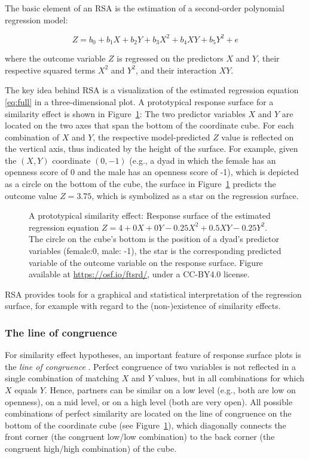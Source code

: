\documentclass[jou,a4paper,draftfirst]{apa6}
\newcommand{\added}[1]{#1}
\begin{document}
The basic element of an RSA is the estimation of a second-order polynomial regression model:

\begin{equation} 
\label{eq:full}
Z = b_0 + b_1 X + b_2 Y + b_3 X^2 + b_4 X Y + b_5 Y^2 + e
\end{equation}

where the outcome variable $Z$ is regressed on the predictors $X$ and $Y$, their respective squared terms $X^2$ and $Y^2$, and their interaction $XY$.

The key idea behind RSA is a visualization of the estimated regression equation \eqref{eq:full} in a three-dimensional plot. A \added{prototypical} response surface \added{for a similarity effect} is shown in Figure~\ref{fig:sqd}: The two predictor variables $X$ and $Y$ are located on the two axes that span the bottom of the coordinate cube. For each combination of $X$ and $Y$, the respective model-predicted $Z$ value is reflected on the vertical axis, thus indicated by the height of the surface. For example, given the $(X,Y)$ coordinate $(0,-1)$ (e.g., a dyad in which the female has an openness score of 0 and the male has an openness score of -1), which is depicted as a circle on the bottom of the cube, the surface in Figure~\ref{fig:sqd} predicts the outcome value $Z = 3.75$, which is symbolized as a star on the regression surface.


\begin{figure}[ht!]
\centering
{}
\caption{\added{A prototypical similarity effect: Response surface of the estimated regression equation $Z = 4 + 0X + 0Y - 0.25X^2 + 0.5XY - 0.25Y^2$. The circle on the cube's bottom is the position of a dyad's predictor variables (female:0, male: -1), the star is the corresponding predicted variable of the outcome variable on the response surface.} Figure available at \url{https://osf.io/ftsrd/}, under a CC-BY4.0 license.}
\label{fig:sqd}
\end{figure}

RSA provides tools for a graphical and statistical interpretation of the regression surface, for example with regard to the (non-)existence of similarity effects. 

\subsubsection{The line of congruence}
For similarity effect hypotheses, an important feature of response surface plots is the \textit{line of congruence} \parencite[LOC,][]{edwards_relationship_2007}. Perfect congruence of two variables is not reflected in a single combination of matching $X$ and $Y$ values, but in all combinations for which $X$ equals $Y$. Hence, partners can be similar on a low level (e.g., both are low on openness), on a mid level, or on a high level (both are very open). All possible combinations of perfect similarity are located on the line of congruence on the bottom of the coordinate cube (see Figure~\ref{fig:sqd}), which diagonally connects the front corner (the congruent low/low combination) to the back corner (the congruent high/high combination) of the cube.
\end{document}
